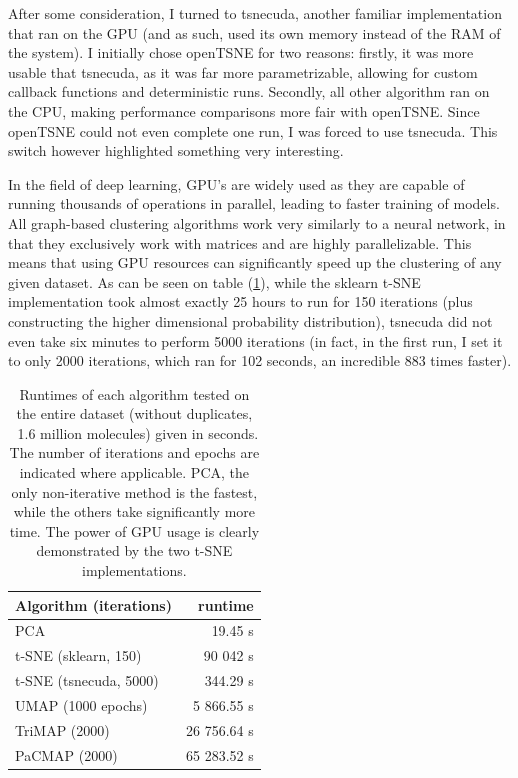 After some consideration, I turned to tsnecuda, another familiar implementation that ran on the GPU (and as such, used its own memory instead of the RAM of the system). I initially chose openTSNE for two reasons: firstly, it was more usable that tsnecuda, as it was far more parametrizable, allowing for custom callback functions and deterministic runs. Secondly, all other algorithm ran on the CPU, making performance comparisons more fair with openTSNE. Since openTSNE could not even complete one run, I was forced to use tsnecuda. This switch however highlighted something very interesting.

In the field of deep learning, GPU's are widely used as they are capable of running thousands of operations in parallel, leading to faster training of models. All graph-based clustering algorithms work very similarly to a neural network, in that they exclusively work with matrices and are highly parallelizable. This means that using GPU resources can significantly speed up the clustering of any given dataset. As can be seen on table (\ref{tab:runtime}), while the sklearn t-SNE implementation took almost exactly 25 hours to run for 150 iterations (plus constructing the higher dimensional probability distribution), tsnecuda did not even take six minutes to perform 5000 iterations (in fact, in the first run, I set it to only 2000 iterations, which ran for 102 seconds, an incredible 883 times faster).

\begin{table}[htb]
	\begin{center}
		\begin{tabular}{|l|r|}
			\hline
			Algorithm (iterations) & runtime \\
			\hline
			PCA & 19.45 s \\
			\hline
			t-SNE (sklearn, 150) & 90 042 s \\
			\hline
			t-SNE (tsnecuda, 5000) & 344.29 s \\
			\hline
			UMAP (1000 epochs) & 5 866.55 s \\
			\hline
			TriMAP (2000) & 26 756.64 s \\
			\hline
			PaCMAP (2000) & 65 283.52 s \\
			\hline
		\end{tabular}
	\end{center}
	\caption{Runtimes of each algorithm tested on the entire dataset (without duplicates, ~1.6 million molecules) given in seconds. The number of iterations and epochs are indicated where applicable. PCA, the only non-iterative method is the fastest, while the others take significantly more time. The power of GPU usage is clearly demonstrated by the two t-SNE implementations.}
	\label{tab:runtime}
\end{table}

